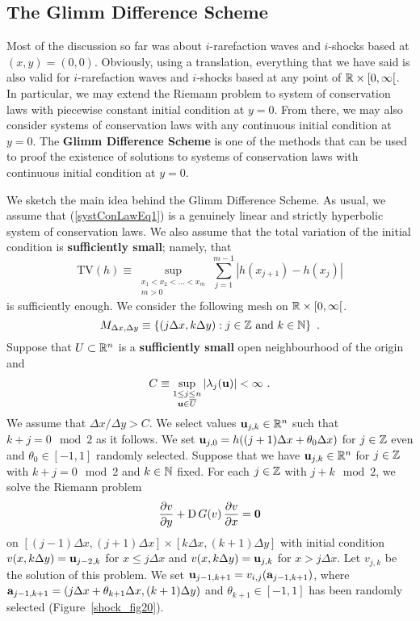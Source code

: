 \subsection{The Glimm Difference Scheme}

Most of the discussion so far was about $i$-rarefaction waves and
$i$-shocks based at $(x,y) = (0,0)$.  Obviously, using a translation,
everything that we have said is also valid for $i$-rarefaction waves
and $i$-shocks based at any point of $\mathbb{R}\times [0,\infty[$.
In particular, we may extend the Riemann problem to system of
conservation laws with piecewise constant initial condition at $y=0$.
From there, we may also consider systems of conservation laws with any
continuous initial condition at $y=0$.  The
{\bfseries Glimm Difference Scheme} is one of the methods that can be used to
proof the existence of solutions to systems of conservation laws with
continuous initial condition at $y=0$.

We sketch the main idea behind the Glimm Difference Scheme.  As usual,
we assume that (\ref{systConLawEq1}) is a genuinely linear and
strictly hyperbolic system of conservation laws.  We also assume that
the total variation of the initial condition is {\bfseries sufficiently small};
namely, that
\[
  \text{TV}(h) \equiv
\sup_{\substack{x_1 < x_2 < \ldots < x_m\\ m >0}} \sum_{j=1}^{m-1} \left|
h(x_{j+1}) - h(x_j) \right|
\]
is sufficiently enough.  We consider the following mesh on
$\mathbb{R}\times [0,\infty[$.
\[
  M_{\Delta x, \Delta y} \equiv \left\{ (j \Delta x , k \Delta y) :
    j \in \mathbb{Z} \ \text{and} \ k \in \mathbb{N} \right\} \ .
\]
Suppose that $U \subset \mathbb{R}^n$ is a {\bfseries sufficiently small}
open neighbourhood of the origin and
\[
  C \equiv \sup_{\substack{1 \leq j \leq n\\
    \mathbf{u} \in \overline{U}}} \left| \lambda_j(\mathbf{u}) \right|
< \infty \ .
\]
We assume that $\Delta x / \Delta y > C$.  We select values
$\mathbf{u}_{j,k} \in \mathbb{R}^n$ such that $k+j = 0 \mod{2}$ as it follows.
We set $\mathbf{u}_{j,0} = h((j+1)\Delta x + \theta_0 \Delta x)$ for
$j \in \mathbb{Z}$ even and $\theta_0 \in [-1,1]$ randomly selected.  Suppose
that we have $\mathbf{u}_{j,k} \in \mathbb{R}^n$
for $j\in \mathbb{Z}$ with $k+j =0 \mod{2}$ and $k\in \mathbb{N}$ fixed.  For each
$j \in \mathbb{Z}$ with $j+k \mod{2}$, we solve the Riemann problem
\[
  \frac{\partial{v}}{\partial y} + \operatorname{D} G(v) \, \frac{\partial{v}}{\partial x} = \mathbf{0}
\]
on $[(j-1)\Delta x, (j+1)\Delta x]\times [k\Delta x,(k+1)\Delta y]$
with initial condition
$v(x, k\Delta y) = \mathbf{u}_{j-2,k}$ for $ x \leq j \Delta x$
and $v(x, k\Delta y) = \mathbf{u}_{j,k}$ for $ x > j \Delta x$.
Let $v_{j,k}$ be the solution of this problem.  We set
$\mathbf{u}_{j-1,k+1} = v_{i,j}(\mathbf{a}_{j-1,k+1})$, where
$\mathbf{a}_{j-1,k+1} = (j\Delta x + \theta_{k+1} \Delta x, (k+1) \Delta y)$
and $\theta_{k+1} \in [-1,1]$ has been randomly selected
(Figure~\ref{shock_fig20}).

